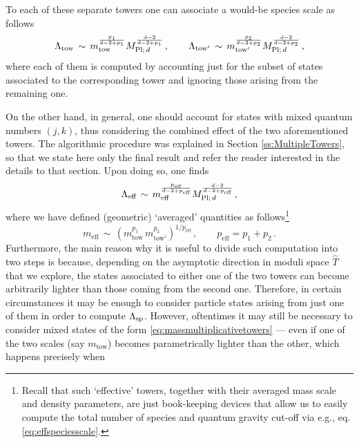 To each of these separate towers one can associate a would-be species scale as follows
%
\begin{equation}\label{eq:powerlikespecies}
  \Lambda_{\text{tow}}\, \sim\, m_{\text{tow}}^{\frac{p_1}{d-2+p_1}} M_{\text{Pl;}\, d}^{\frac{d-2}{d-2+p_1}}\, , \qquad \Lambda_{\text{tow}'}\, \sim\, m_{\text{tow}'}^{\frac{p_2}{d-2+p_2}}M_{\text{Pl;}\, d}^{\frac{d-2}{d-2+p_2}}\, ,
\end{equation}
%
where each of them is computed by accounting just for the subset of states associated to the corresponding tower and ignoring those arising from the remaining one.%

On the other hand, in general, one should account for states with mixed quantum numbers $(j,k)$, thus considering the combined effect of the two aforementioned towers. The algorithmic procedure was explained in Section \ref{ss:MultipleTowers}, so that we state here only the final result and refer the reader interested in the details to that section. Upon doing so, one finds
%
\begin{equation}\label{eq:effspeciesscale}
  \Lambda_{\text{eff}}\, \sim\, m_{\text{eff}}^{\frac{p_{\text{eff}}}{d-2+p_{\text{eff}}}}M_{\text{Pl;}\, d}^{\frac{d-2}{d-2+p_{\text{eff}}}}\, ,
\end{equation}
%
where we have defined (geometric) `averaged' quantities as follows\footnote{Recall that such `effective' towers, together with their averaged mass scale and density parameters, are just book-keeping devices that allow us to easily compute the total number of species and quantum gravity cut-off via e.g., eq. \eqref{eq:effspeciesscale}.}
%
\begin{equation}\label{eq:masseffectivetower}
  m_{\text{eff}}\, \sim\, \left( m_{\text{tow}}^{p_{1}}\, m_{\text{tow}'}^{p_{2}} \right)^{1/p_{\text{eff}}}\, , \qquad p_{\text{eff}} = p_1 + p_2 \, .
\end{equation}
%
Furthermore, the main reason why it is useful to divide such computation into two steps is because, depending on the asymptotic direction in moduli space $\hat T$ that we explore, the states associated to either one of the two towers can become arbitrarily lighter than those coming from the second one. Therefore, in certain circumstances it may be enough to consider particle states arising from just one of them in order to compute $\Lambda_{\text{sp}}$. However, oftentimes it may still be necessary to consider mixed states of the form \eqref{eq:massmultiplicativetowers} --- even if one of the two scales (say $m_{\text{tow}}$) becomes parametrically lighter than the other, which happens precisely when
